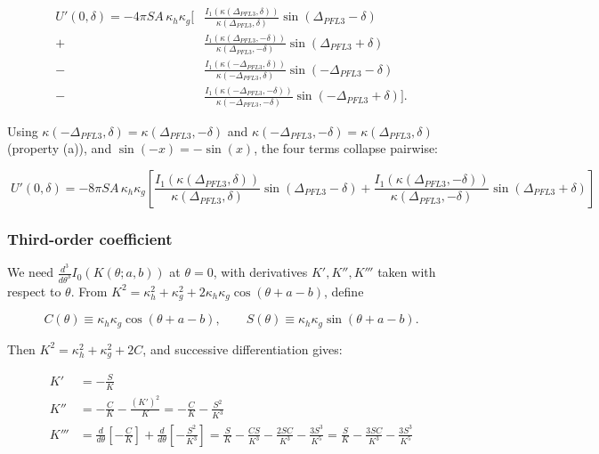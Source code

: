 \documentclass[11pt]{article}
\begin{document}
\begin{equation}
\begin{aligned}
U'(0, \delta) = -4\pi SA\, \kappa_h\kappa_g \bigg[ &\frac{I_1(\kappa(\Delta_{PFL3}, \delta))}{\kappa(\Delta_{PFL3}, \delta)} \sin(\Delta_{PFL3} - \delta) \\
+\, &\frac{I_1(\kappa(\Delta_{PFL3}, -\delta))}{\kappa(\Delta_{PFL3}, -\delta)} \sin(\Delta_{PFL3} + \delta) \\
-\, &\frac{I_1(\kappa(-\Delta_{PFL3}, \delta))}{\kappa(-\Delta_{PFL3}, \delta)} \sin(-\Delta_{PFL3} - \delta) \\
-\, &\frac{I_1(\kappa(-\Delta_{PFL3}, -\delta))}{\kappa(-\Delta_{PFL3}, -\delta)} \sin(-\Delta_{PFL3} + \delta) \bigg].
\end{aligned}
\end{equation}

Using $\kappa(-\Delta_{PFL3}, \delta) = \kappa(\Delta_{PFL3}, -\delta)$ and $\kappa(-\Delta_{PFL3}, -\delta) = \kappa(\Delta_{PFL3}, \delta)$ (property (a)), and $\sin(-x) = -\sin(x)$, the four terms collapse pairwise:

\begin{equation}
\boxed{\;U'(0, \delta) = -8\pi SA\, \kappa_h\kappa_g \left[ \frac{I_1(\kappa(\Delta_{PFL3}, \delta))}{\kappa(\Delta_{PFL3}, \delta)} \sin(\Delta_{PFL3} - \delta) + \frac{I_1(\kappa(\Delta_{PFL3}, -\delta))}{\kappa(\Delta_{PFL3}, -\delta)} \sin(\Delta_{PFL3} + \delta) \right]\;}
\end{equation}

\subsubsection{Third-order coefficient}

We need $\frac{d^3}{d\theta^3} I_0(K(\theta; a, b))$ at $\theta = 0$, with derivatives $K', K'', K'''$ taken with respect to $\theta$. From $K^2 = \kappa_h^2 + \kappa_g^2 + 2\kappa_h\kappa_g\cos(\theta + a - b)$, define

\begin{equation*}
C(\theta) \equiv \kappa_h\kappa_g\cos(\theta + a - b), \qquad S(\theta) \equiv \kappa_h\kappa_g\sin(\theta + a - b).
\end{equation*}

Then $K^2 = \kappa_h^2 + \kappa_g^2 + 2C$, and successive differentiation gives:

\begin{equation*}
\begin{aligned}
K' &= -\frac{S}{K} \\
K'' &= -\frac{C}{K} - \frac{(K')^2}{K} = -\frac{C}{K} - \frac{S^2}{K^3} \\
K''' &= \frac{d}{d\theta}\left[ -\frac{C}{K} \right]+\frac{d}{d\theta}\left[ -\frac{S^{2}}{K^{3}} \right]=\frac{S}{K}-\frac{CS}{K^{3}}-\frac{2SC}{K^{3}}-\frac{3S^{3}}{K^{5}}=\frac{S}{K}-\frac{3SC}{K^{3}}-\frac{3S^{3}}{K^{5}}
\end{aligned}
\end{equation*}
\end{document}
